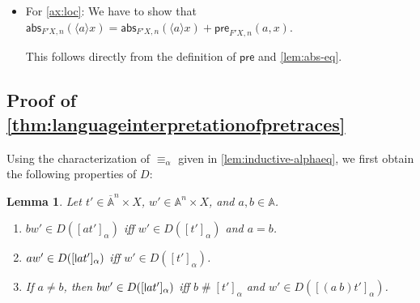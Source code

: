 \documentclass[11pt,a4paper]{amsart}
\newtheorem{lemma}[lemma]{Lemma}
\newcommand{\pre}{\mathsf{pre}}
\newcommand{\abs}{\mathsf{abs}}
\newcommand{\res}{\mathsf{res}}
\newcommand{\Names}{\mathbb{A}}
\newcommand{\barNames}{\overline{\Names}}
\newcommand{\alphaeq}{\equiv_\alpha}
\newcommand{\fresh}{\mathbin{\#}}
\newcommand{\supp}{\mathsf{supp}}
\newcommand{\bind}[1]{\langle #1\rangle}
\theoremstyle{plain}
\newcommand{\midmid}{\hspace{0.2ex}{\rule[-0.1ex]{0.6pt}{1.65ex}}\hspace{0.2ex}}
\newcommand{\newletter}[1]{{\midmid}#1}
\numberwithin{equation}{section}
\newcommand{\+}[1]{\mathcal{#1}\xspace}
\theoremstyle{definition}
\begin{document}
\begin{itemize}
    If \(b \neq e\), pick \(c \in \Names \setminus \supp(x,a,b,e)\).
    We then have
    \begin{align*}
      &\abs_{F'X,n}(\bind{a} \res_{F'X, n}(\bind{b} x))(e) \\
      =~&\res_{F'X,n}(\bind{c} (e\ c) \cdot (a\ c) \cdot \res_{F'X, n}(\bind{b} x)) && \text{definition} \\
      =~&(e\ c) \cdot \res_{F'X,n}(\bind{e} \res_{F'X,n}(\bind{b} (a\ c) \cdot x)) && \text{equivariance} \\
      =~&(e\ c) \cdot \res_{F'X,n}(\bind{b} \res_{F'X,n}(\bind{e} (a\ c) \cdot x)) && \text{axioms} \\
      =~&\res_{F'X,n}(\bind{b} (e\ c) \cdot \res_{F'X,n}(\bind{e} (a\ c) \cdot x)) && \text{equivariance} \\
      =~&\res_{F'X,n}(\bind{b} \abs_{F'X,n}(\bind{a} x)(e)) && \text{definition} \\
      =~&\res_{F'X,n+1}(\bind{b} \abs_{F'X,n}(\bind{a} x))(e) && \text{because } b \neq e.
    \end{align*}
  \item For \eqref{ax:loc}:
    We have to show that \(\abs_{F'X,n}(\bind{a}x) = \abs_{F'X,n}(\bind{a}x) + \pre_{F'X,n}(a,x).\)

    This follows directly from the definition of \(\pre\) and \cref{lem:abs-eq}.
\end{itemize}

\subsection*{Proof of \cref{thm:languageinterpretationofpretraces}}

Using the characterization of \(\alphaeq\) given in \cref{lem:inductive-alphaeq}, we first obtain the following properties of \(D\):

\begin{lemma}\label{lem:generated-language-prefix}
  Let \(t' \in \barNames^{n} \times X\), \(w' \in \Names^n \times X\), and \(a, b \in \Names\).
  \begin{enumerate}
    \item \label{itm:generated-language-prefix-free}
      \(bw' \in D([at']_\alpha)\) iff \(w' \in D([t']_\alpha)\) and \(a = b\).
    \item \label{itm:generated-language-prefix-bound-equal}
      \(aw' \in D([\newletter{a}t']_\alpha)\) iff \(w' \in D([t']_\alpha)\).
    \item \label{itm:generated-language-prefix-bound-different}
      If \(a \neq b\), then \(bw' \in D([\newletter{a}t']_\alpha)\) iff \(b \fresh [t']_\alpha\) and \(w' \in D([(a\ b)t']_\alpha)\).
  \end{enumerate}
\end{lemma}
\end{document}
